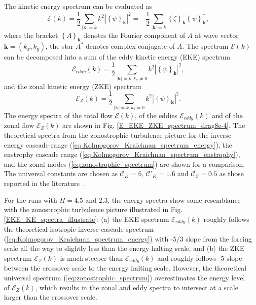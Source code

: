 \documentclass{ametsoc}
\begin{document}
The kinetic energy spectrum can be evaluated as
\begin{equation}
\mathcal{E}(k)=\frac{1}{2}\underset{|\mathbf{k}|=k}{\sum}k^{2}|\left\{ \psi\right\} _{\mathbf{k}}|^{2}=-\frac{1}{2}\underset{|\mathbf{k}|=k}{\sum}\left\{ \zeta\right\} _{\mathbf{k}}\left\{ \psi\right\} _{\mathbf{k}}^{*},\label{eq:energy_spectrum_psi_zeta}
\end{equation}
where the bracket $\left\{ A\right\} _{\mathbf{k}}$ denotes the Fourier
component of $A$ at wave vector $\mathbf{k}=(k_{x},k_{y})$, the
star $A^{*}$ denotes complex conjugate of $A$. The spectrum $\mathcal{E}(k)$
can be decomposed into a sum of the eddy kinetic energy (EKE) spectrum
\begin{equation}
\mathcal{E}_{eddy}(k)=\frac{1}{2}\underset{|\mathbf{k}|=k,k_{x}\neq0}{\sum}k^{2}|\left\{ \psi\right\} _{\mathbf{k}}|^{2},\label{eq:EKE_spec_psi}
\end{equation}
and the zonal kinetic energy (ZKE) spectrum
\begin{equation}
\mathcal{E}_{Z}(k)=\frac{1}{2}\underset{|\mathbf{k}|=k,k_{x}=0}{\sum}k^{2}|\left\{ \psi\right\} _{\mathbf{k}}|^{2}.\label{eq:ZKE_spec_psi}
\end{equation}
The energy spectra of the total flow $\mathcal{E}(k)$, of the eddies
$\mathcal{E}_{eddy}(k)$ and of the zonal flow $\mathcal{E}_{Z}(k)$
are shown in Fig. \ref{E_EKE_ZKE_spectrum_drag8e-4}. The theoretical
spectra from the zonostrophic turbulence picture for the inverse energy 
cascade range (\ref{eq:Kolmogorov_Kraichnan_spectrum_energy}),
the enstrophy cascade range (\ref{eq:Kolmogorov_Kraichnan_spectrum_enstrophy}),
and the zonal modes (\ref{eq:zonostrophic_spectrum}) 
are shown for a comparison. The universal constants are chosen as
$\mathcal{C}_{K}=6$, $\mathcal{C'}_{K}=1.6$ and $\mathcal{C}_{Z}=0.5$
as those reported in the literature \citep{Boffetta2012,Galperin2010}.

For the runs with $\Pi=4.5$ and 2.3, the energy spectra show some
resemblance with the zonostrophic turbulence picture illustrated in 
Fig. \ref{EKE_KE_spectra_illustrate}: (a) the EKE spectrum $\mathcal{E}_{eddy}(k)$ 
roughly follows the theoretical isotropic inverse cascade spectrum 
(\ref{eq:Kolmogorov_Kraichnan_spectrum_energy}) with -5/3 slope
from the forcing scale all the way to slightly less than the energy
halting scale, and (b) the ZKE spectrum $\mathcal{E}_{Z}(k)$
is much steeper than $\mathcal{E}_{eddy}(k)$ and roughly follows -5 slope
between the crossover scale to the energy halting scale. However, the theoretical
universal spectrum (\ref{eq:zonostrophic_spectrum}) overestimates 
the energy level of $\mathcal{E}_{Z}(k)$, which results in the zonal
and eddy spectra to intersect at a scale larger than the crossover
scale.
\end{document}
